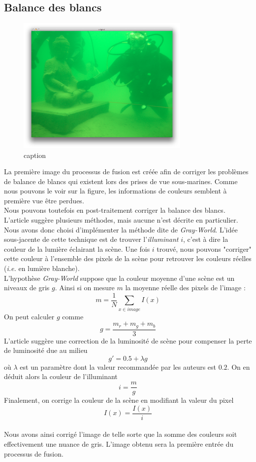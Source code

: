 \documentclass[twoside]{article}
\begin{document}
\subsection{Balance des blancs}

\begin{figure}[H]
  \centering
  \includegraphics[width=0.75\textwidth]{Support/input.png}
  \caption{caption}
\end{figure}

La première image du processus de fusion est créée afin de corriger les problèmes de balance de blancs qui existent lors des prises de vue sous-marines. Comme nous pouvons le voir sur la figure, les informations de couleurs semblent à première vue être perdues.\\
Nous pouvons toutefois en post-traitement corriger la balance des blancs. L'article suggère plusieurs méthodes, mais aucune n'est décrite en particulier. Nous avons donc choisi d'implémenter la méthode dite de \emph{Gray-World}. L'idée sous-jacente de cette technique est de trouver l'\emph{illuminant} $i$, c'est à dire la couleur de la lumière éclairant la scène. Une fois $i$ trouvé, nous pouvons "corriger" cette couleur à l'ensemble des pixels de la scène pour retrouver les couleurs réelles (\emph{i.e.} en lumière blanche).\\
L'hypothèse \emph{Gray-World} suppose que la couleur moyenne d'une scène est un niveaux de gris $g$. Ainsi si on mesure $m$ la moyenne réelle des pixels de l'image : $$m = \frac{1}{N}\sum_{x \in image}I(x)$$ On peut calculer $g$ comme $$g = \frac{m_r + m_g + m_b}{3}$$ L'article suggère une correction de la luminosité de scène pour compenser la perte de luminosité due au milieu $$g' = 0.5 + \lambda g$$ où $\lambda$ est un paramètre dont la valeur recommandée par les auteurs est $0.2$. On en déduit alors la couleur de l'illuminant $$ i = \frac{m}{g}$$ Finalement, on corrige la couleur de la scène en modifiant la valeur du pixel $$I(x) = \frac{I(x)}{i}$$\\
Nous avons ainsi corrigé l'image de telle sorte que la somme des couleurs soit effectivement une nuance de gris. L'image obtenu sera la première entrée du processus de fusion.
\end{document}
